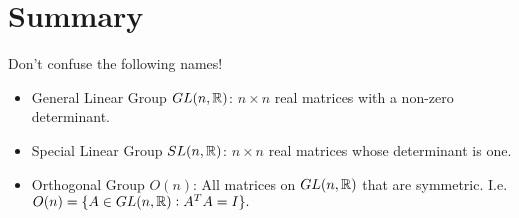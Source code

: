 \section{Summary}
\begin{summary}
	Don't confuse the following names!
	\begin{itemize}
		\item General Linear Group $ GL(n,\mathbb{R}) $: $ n\times n $ real matrices with a non-zero determinant.
		\item Special Linear Group $ SL(n,\mathbb{R}) $: $ n\times n $ real matrices whose determinant is one.
		\item Orthogonal Group $ O(n) $: All matrices on $ GL(n,\mathbb{R}) $ that are symmetric. I.e.
		$ O(n) = \{A \in GL(n,\mathbb{R}): A^T A = I\}. $
	\end{itemize}
\end{summary}